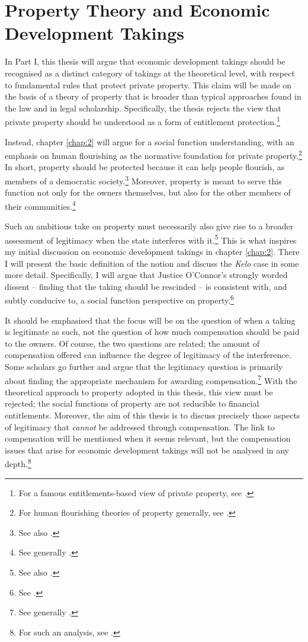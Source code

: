 \section{Property Theory and Economic Development Takings}\label{sec:1:1}

In Part I, this thesis will argue that economic development takings should be recognised as a distinct category of takings at the theoretical level, with respect to fundamental rules that protect private property. This claim will be made on the basis of a theory of property that is broader than typical approaches found in the law and in legal scholarship. Specifically, the thesis rejects the view that private property should be understood as a form of entitlement protection.\footnote{For a famous entitlements-based view of private property, see \cite{calabresi72}.}

Instead, chapter \ref{chap:2} will argue for a social function understanding, with an emphasis on human flourishing as the normative foundation for private property.\footnote{For human flourishing theories of property generally, see \cite[chapter 5]{alexander10}.} In short, property should be protected because it can help people flourish, as members of a democratic society.\footnote{See also \cite[1089]{crawford11}.} Moreover, property is meant to serve this function not only for the owners themselves, but also for the other members of their communities.\footnote{See generally \cite{gray94,alexander09d,alexander14}.}

Such an ambitious take on property must necessarily also give rise to a broader assessment of legitimacy when the state interferes with it.\footnote{See also \cite{underkuffler06}.} This is what inspires my initial discussion on economic development takings in chapter \ref{chap:2}. There I will present the basic definition of the notion and discuss the {\it Kelo} case in some more detail. Specifically, I will argue that Justice O'Connor's strongly worded dissent -- finding that the taking should be rescinded -- is consistent with, and subtly conducive to, a social function perspective on property.\footnote{See \cite[494-505]{kelo05}.}

It should be emphasised that the focus will be on the question of when a taking is legitimate as such, not the question of how much compensation should be paid to the owners. Of course, the two questions are related; the amount of compensation offered can influence the degree of legitimacy of the interference. Some scholars go further and argue that the legitimacy question is primarily about finding the appropriate mechanism for awarding compensation.\footnote{See generally \cite{fennell04,bell07,lehavi07}.} With the theoretical approach to property adopted in this thesis, this view must be rejected; the social functions of property are not reducible to financial entitlements. Moreover, the aim of this thesis is to discuss precisely those aspects of legitimacy that {\it cannot} be addressed through compensation. The link to compensation will be mentioned when it seems relevant, but the compensation issues that arise for economic development takings will not be analysed in any depth.\footnote{For such an analysis, see \cite{dyrkolbotn15a}.}

